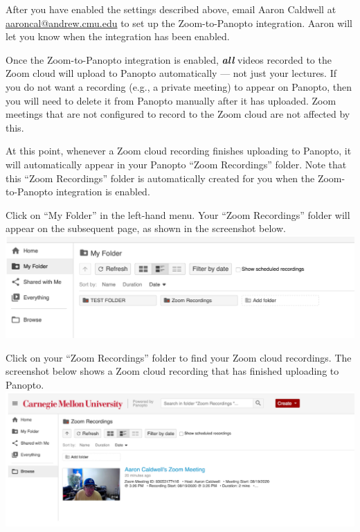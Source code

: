 \begin{gram}[Step 2/2]
	After you have enabled the settings described above, email Aaron Caldwell at \href{mailto:aaroncal@andrew.cmu.edu?subject=Zoom-to-Panopto}{aaroncal@andrew.cmu.edu} to set up the Zoom-to-Panopto integration. Aaron will let you know when the integration has been enabled.
\end{gram}

\begin{important}
	Once the Zoom-to-Panopto integration is enabled, \emph{\textbf{all}} videos recorded to the Zoom cloud will upload to Panopto automatically --- not just your lectures. If you do not want a recording (e.g., a private meeting) to appear on Panopto, then you will need to delete it from Panopto manually after it has uploaded. Zoom meetings that are not configured to record to the Zoom cloud are not affected by this.
\end{important}

\begin{gram}
 	At this point, whenever a Zoom cloud recording finishes uploading to Panopto, it will automatically appear in your Panopto ``Zoom Recordings'' folder. Note that this ``Zoom Recordings'' folder is automatically created for you when the Zoom-to-Panopto integration is enabled.
\end{gram}

\begin{gram}
	Click on ``My Folder'' in the left-hand menu. Your ``Zoom Recordings'' folder will appear on the subsequent page, as shown in the screenshot below.
{
		\centering
		\includegraphics[scale=0.6]{panopto/media/05-my-folder.png}
}
\end{gram}

\begin{gram}
	Click on your ``Zoom Recordings'' folder to find your Zoom cloud recordings. The screenshot below shows a Zoom cloud recording that has finished uploading to Panopto.
{
		\centering
		\includegraphics[scale=0.7]{panopto/media/06-zoom-recordings.png}
}
\end{gram}


